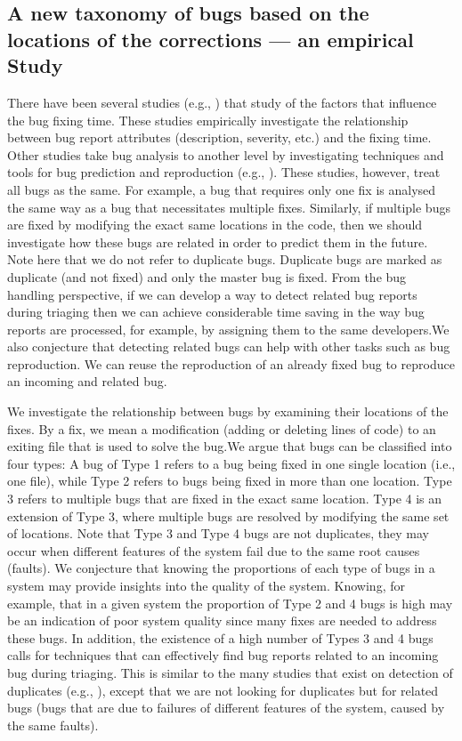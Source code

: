 \subsection{A new taxonomy of bugs based on the locations of the corrections --- an empirical Study}

There have been several studies (e.g., \cite{Weiß2007, Zhang2013}) that study of the factors that influence the bug fixing time.
These studies   empirically investigate the relationship between bug report attributes (description, severity, etc.) and the fixing time. Other studies take bug analysis to another level by investigating techniques and tools for bug prediction and reproduction (e.g., \cite{Chen2013, Kim2007a, Nayrolles2015}). These studies, however, treat all bugs as the same.
For example, a bug that requires only one fix is analysed the same way as a bug that necessitates multiple fixes.
Similarly, if multiple bugs are fixed by modifying the exact same locations in the code, then we should investigate how these bugs are related in order to predict them in the future. Note here that we do not refer to duplicate bugs. Duplicate bugs are marked as duplicate (and not fixed) and only the master bug is fixed. From the bug handling perspective, if we can develop a way to detect related bug reports during triaging then we can achieve considerable time saving in the way bug reports are processed, for example, by assigning them to the same developers.We also conjecture that detecting related bugs can help with other tasks such as bug reproduction. We can  reuse the reproduction of an already fixed bug to reproduce an incoming and related bug.

We investigate the relationship between bugs by examining their locations of the fixes.
By a fix, we mean a modification (adding or deleting lines of code) to an exiting file that is used to solve the bug.We argue that bugs can be classified into four types:
A bug of Type 1 refers to a bug being fixed in one single location (i.e., one file), while Type 2 refers to bugs being fixed in more than one location.
Type 3 refers to multiple bugs that are fixed in the exact same location.
Type 4 is an extension of Type 3, where multiple bugs are resolved by modifying the same set of locations.
Note that Type 3 and Type 4 bugs are not duplicates, they may occur when different features of the system fail due to the same root causes (faults).
We conjecture that knowing the proportions of each type of bugs in a system may provide insights into the quality of the system.
Knowing, for example, that in a given system the proportion of Type 2 and 4 bugs is high may be an indication of poor system quality since many fixes are needed to address these bugs.
In addition, the existence of a high number of Types 3 and 4 bugs calls for techniques that can effectively find bug reports related to an incoming bug during triaging.
This is similar to the many studies that exist on detection of duplicates (e.g., \cite{Runeson2007, Sun2010,Nguyen2012}), except that we are not looking for duplicates but for related bugs (bugs that are due to failures of different features of the system, caused by the same faults).

